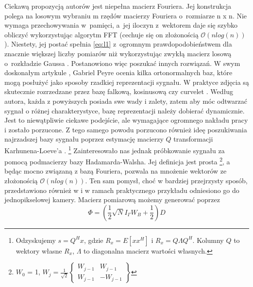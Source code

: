 Ciekawą propozycją autorów jest niepełna macierz Fouriera. Jej konstrukcja polega na losowym wybraniu m rzędów macierzy Fouriera o~rozmiarze n x n. Nie wymaga przechowywania w~pamięci, a~jej iloczyn z~wektorem daje się szybko obliczyć wykorzystując algorytm FFT (cechuje się on złożonością $\mathcal{O}(nlog(n))$). Niestety, jej postać spełnia \ref{eq:l1} z~ogromnym prawdopodobieństwem dla znacznie większej liczby pomiarów niż wykorzystując zwykłą macierz losową o~rozkładzie Gaussa  \cite{Rudelson2008}. Postanowiono więc poszukać innych rozwiązań. W swym doskonałym artykule \cite{Peyre2010}, Gabriel Peyre ocenia kilka ortonormalnych baz, które mogą posłużyć jako sposoby rzadkiej reprezentacji sygnału. W praktyce zdjęcia są skutecznie rozrzedzane przez bazę falkową, kosinusową czy curvelet \cite{CurveletWebSite, Candes2000}. Według autora, każda z powyższych posiada swe wady i zalety, zatem aby móc odtwarzać sygnał o różnej charakterystyce, bazę reprezentacji należy dobierać dynamicznie. Jest to niewątpliwie ciekawe podejście, ale wymagające ogromnego nakładu pracy i zostało porzucone. Z tego samego powodu porzucono również ideę poszukiwania najrzadszej bazy sygnału poprzez estymację macierzy $Q$ transformacji Karhunena-Loeve'a \cite{Gwon2012}. \footnote{Odzyskujemy $s = Q^H x$, gdzie $R_x = E[xx^H]$ i $R_x = Q \Lambda Q^H$. Kolumny $Q$ to wektory własne $R_x$, $\Lambda$ to diagonalna macierz wartości własnych.} Zainteresowało nas jednak próbkowanie sygnału za pomocą podmacierzy bazy Hadamarda-Walsha. Jej definicja jest prosta \footnote{$W_0$ = 1, $W_j = \frac{1}{\sqrt{2}} \begin{Bmatrix} W_{j-1} & W_{j-1} \\ W_{j-1} & -W_{j-1} \end{Bmatrix}$}, a będąc mocno związaną z bazą Fouriera, pozwala na mnożenie wektorów ze złożonością $\mathcal{O}(nlog(n))$. Ten sam pomysł, choć w bardziej przejrzysty sposób, przedstawiono również w \cite{Davenport2010} i w ramach praktycznego przykładu odniesiono go do jednopikselowej kamery. Macierz pomiarową możemy generować poprzez 
\begin{equation}
	\Phi = \left(\frac{1}{2} \sqrt{N} I_\Gamma W_B + \frac{1}{2} \right) D
\end{equation}

